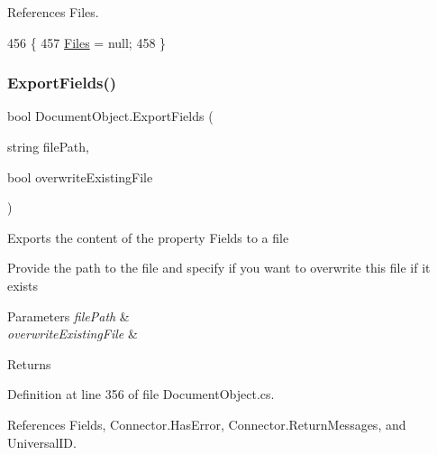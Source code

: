 References Files.


\begin{DoxyCode}
456                              \{
457         \mbox{\hyperlink{class_document_object_afe6bcf5175607f91dde768491f23a0a4}{Files}} = null;
458     \}
\end{DoxyCode}
\mbox{\label{class_document_object_a1a763aa01710b370634f46c89b7d2d8e}} 
\subsubsection{\texorpdfstring{Export\+Fields()}{ExportFields()}}
{\footnotesize\ttfamily bool Document\+Object.\+Export\+Fields (\begin{DoxyParamCaption}\item[{string}]{file\+Path,  }\item[{bool}]{overwrite\+Existing\+File }\end{DoxyParamCaption})}



Exports the content of the property \textquotesingle{}Fields\textquotesingle{} to a file 

Provide the path to the file and specify if you want to overwrite this file if it exists


\begin{DoxyParams}{Parameters}
{\em file\+Path} & \\
\hline
{\em overwrite\+Existing\+File} & \\
\hline
\end{DoxyParams}
\begin{DoxyReturn}{Returns}

\end{DoxyReturn}


Definition at line 356 of file Document\+Object.\+cs.



References Fields, Connector.\+Has\+Error, Connector.\+Return\+Messages, and Universal\+ID.


